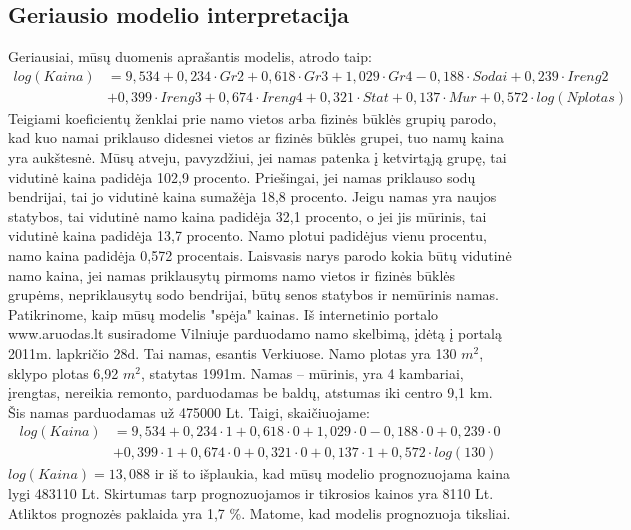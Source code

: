 \documentclass[a4paper]{article}
\begin{document}
\subsection{Geriausio modelio interpretacija}
\hspace*{0,52cm}Geriausiai, mūsų duomenis aprašantis modelis, atrodo taip:
\begin{align*}
log(Kaina)&=9,534+0,234\cdot Gr2+0,618\cdot Gr3+1,029\cdot Gr4 -0,188\cdot Sodai+0,239\cdot Ireng2\\
&+0,399\cdot Ireng3+0,674\cdot Ireng4+0,321\cdot Stat+0,137\cdot Mur+0,572\cdot log(Nplotas)
\end{align*}
\hspace*{0,52cm}Teigiami koeficientų ženklai prie namo vietos arba fizinės būklės grupių parodo, kad kuo namai priklauso didesnei vietos ar fizinės būklės grupei, tuo namų kaina yra aukštesnė. Mūsų atveju, pavyzdžiui, jei namas patenka į ketvirtąją grupę, tai vidutinė kaina padidėja 102,9 procento. Priešingai, jei namas priklauso sodų bendrijai, tai jo vidutinė kaina sumažėja 18,8 procento. 
Jeigu namas yra naujos statybos, tai vidutinė namo kaina padidėja 32,1 procento, o jei jis mūrinis, tai vidutinė kaina padidėja 13,7 procento. Namo plotui padidėjus vienu procentu, namo kaina padidėja 0,572 procentais. Laisvasis narys parodo kokia būtų vidutinė namo kaina, jei namas priklausytų pirmoms namo vietos ir fizinės būklės grupėms, nepriklausytų sodo bendrijai, būtų senos statybos ir nemūrinis namas. \\
\hspace*{0,52cm}Patikrinome, kaip mūsų modelis "spėja" kainas. Iš internetinio portalo www.aruodas.lt susiradome Vilniuje parduodamo namo skelbimą, įdėtą į portalą 2011m. lapkričio 28d. Tai namas, esantis Verkiuose. Namo plotas yra 130 $m^2$, sklypo plotas 6,92 $m^2$, statytas 1991m. Namas -- mūrinis, yra 4 kambariai, įrengtas, nereikia remonto, parduodamas be baldų, atstumas iki centro 9,1 km. Šis namas parduodamas už 475000 Lt. Taigi, skaičiuojame:
\begin{align*}
log(Kaina)&=9,534+0,234\cdot 1+0,618\cdot 0+1,029\cdot 0 -0,188\cdot 0+0,239\cdot 0\\
&+0,399\cdot 1+0,674\cdot 0+0,321\cdot 0+0,137\cdot 1+0,572\cdot log(130)
\end{align*}
$log(Kaina)=13,088$ ir iš to išplaukia, kad mūsų modelio prognozuojama kaina lygi 483110 Lt. Skirtumas tarp prognozuojamos ir tikrosios kainos yra 8110 Lt. Atliktos prognozės paklaida yra 1,7 \%. Matome, kad modelis prognozuoja tiksliai.
\newpage
\end{document}
